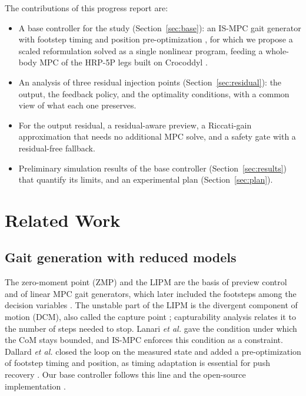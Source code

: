 \documentclass[conference]{IEEEtran}
\begin{document}
The contributions of this progress report are:
\begin{itemize}
\item A base controller for the study (Section~\ref{sec:base}): an IS-MPC gait generator \cite{scianca2020ismpc} with footstep timing and position pre-optimization \cite{dallard2025adios}, for which we propose a scaled reformulation solved as a single nonlinear program, feeding a whole-body MPC of the HRP-5P \cite{kaneko2019hrp5p} legs built on Crocoddyl \cite{mastalli2020crocoddyl}.
\item An analysis of three residual injection points (Section~\ref{sec:residual}): the output, the feedback policy, and the optimality conditions, with a common view of what each one preserves.
\item For the output residual, a residual-aware preview, a Riccati-gain approximation that needs no additional MPC solve, and a safety gate with a residual-free fallback.
\item Preliminary simulation results of the base controller (Section~\ref{sec:results}) that quantify its limits, and an experimental plan (Section~\ref{sec:plan}).
\end{itemize}

\section{Related Work}

\subsection{Gait generation with reduced models}
The zero-moment point (ZMP) \cite{vukobratovic2004zmp} and the LIPM \cite{kajita2001lipm} are the basis of preview control \cite{kajita2003preview} and of linear MPC gait generators, which later included the footsteps among the decision variables \cite{wieber2006mpc,herdt2010online}.
The unstable part of the LIPM is the divergent component of motion (DCM), also called the capture point \cite{pratt2006capture,takenaka2009dcm,englsberger2011capture}; capturability analysis \cite{koolen2012capturability} relates it to the number of steps needed to stop.
Lanari \emph{et al.} \cite{lanari2014boundedness} gave the condition under which the CoM stays bounded, and IS-MPC \cite{scianca2020ismpc} enforces this condition as a constraint.
Dallard \emph{et al.} \cite{dallard2025adios} closed the loop on the measured state and added a pre-optimization of footstep timing and position, as timing adaptation is essential for push recovery \cite{khadiv2020timing}.
Our base controller follows this line and the open-source implementation \cite{ismpcwalking}.
\end{document}
